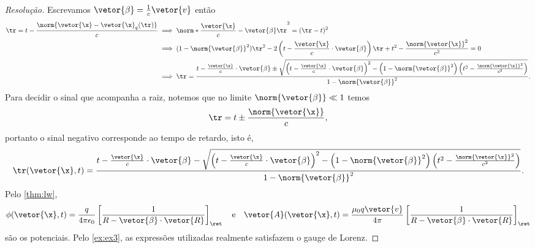 \begin{proof}[Resolução]
   Escrevamos \(\vetor{\beta} = \frac1c \vetor{v}\) então
   \begin{align*}
      \tr = t - \frac{\norm{\vetor{\x} - \vetor{\x}_q(\tr)}}{c} &\implies \norm*{\frac{\vetor{\x}}{c} - \vetor{\beta}  \tr}^2 = (\tr - t)^2\\
                                                                &\implies (1 - \norm{\vetor{\beta}}^2) \tr^2 - 2 \left(t - \frac{\vetor{\x}}{c} \cdot \vetor{\beta}\right) \tr + t^2 - \frac{\norm{\vetor{\x}}^2}{c^2} = 0\\
                                                                &\implies \tr = \frac{t - \frac{\vetor{\x}}{c} \cdot \vetor{\beta} \pm \sqrt{\left(t - \frac{\vetor{\x}}{c} \cdot \vetor{\beta}\right)^2 - \left(1 - \norm{\vetor{\beta}}^2\right)\left(t^2 - \frac{\norm{\vetor{\x}}^2}{c^2}\right)}}{1 - \norm{\vetor{\beta}}^2}.
   \end{align*}
   Para decidir o sinal que acompanha a raiz, notemos que no limite \(\norm{\vetor{\beta}} \ll 1\) temos
   \begin{equation*}
      \tr = t \pm \frac{\norm{\vetor{\x}}}{c},
   \end{equation*}
   portanto o sinal negativo corresponde ao tempo de retardo, isto é,
   \begin{equation*}
      \tr(\vetor{\x}, t) = \frac{t - \frac{\vetor{\x}}{c} \cdot \vetor{\beta} - \sqrt{\left(t - \frac{\vetor{\x}}{c} \cdot \vetor{\beta}\right)^2 - \left(1 - \norm{\vetor{\beta}}^2\right)\left(t^2 - \frac{\norm{\vetor{\x}}^2}{c^2}\right)}}{1 - \norm{\vetor{\beta}}^2}.
   \end{equation*}
   Pelo \cref{thm:lw},
   \begin{equation*}
      \phi(\vetor{\x}, t) = \frac{q}{4\pi \epsilon_0}\left[\frac{1}{R - \vetor{\beta} \cdot \vetor{R}}\right]_{\ret}
      \quad\text{e}\quad
      \vetor{A}(\vetor{\x}, t) = \frac{\mu_0 q\vetor{v}}{4\pi}\left[\frac{1}{R - \vetor{\beta}\cdot \vetor{R}}\right]_{\ret}
   \end{equation*}
   são os potenciais. Pelo \cref{ex:ex3}, as expressões utilizadas realmente satisfazem o gauge de Lorenz.
\end{proof}
